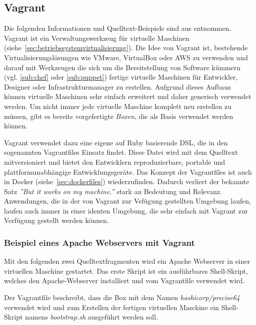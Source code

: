 \subsection{Vagrant}
\label{sub:vagrant}
Die folgenden Informationen und Quelltext-Beispiele sind aus \autocite{Vagrant:online} entnommen.
Vagrant ist ein Verwaltungswerkzeug für virtuelle Maschinen (siehe~\vref{sec:betriebssystemvirtualisierung}).
Die Idee von Vagrant ist, bestehende Virtualisierungslösungen wie VMware, VirtualBox oder AWS zu verwenden und darauf mit Werkzeugen die sich um die Bereitstellung von Software kümmern (vgl. \cref{sub:chef} oder \cref{sub:puppet}) fertige virtuelle Maschinen für Entwickler, Designer oder Infrastrukturmanager zu erstellen.
Aufgrund dieses Aufbaus können virtuelle Maschinen sehr einfach erweitert und daher generisch verwendet werden.
Um nicht immer jede virtuelle Maschine komplett neu erstellen zu müssen, gibt es bereits vorgefertigte \emph{Boxen}, die als Basis verwendet werden können.

Vagrant verwendet dazu eine eigene auf Ruby basierende DSL, die in den sogenannten Vagrantfiles Einsatz findet.
Diese Datei wird mit dem Quelltext mitversioniert und bietet den Entwicklern reproduzierbare, portable und plattformunabhängige Entwicklungsgeräte.
Das Konzept der Vagrantfiles ist auch in Docker (siehe~\vref{sec:dockerfiles}) wiederzufinden.
Dadurch verliert der bekannte Satz \emph{''But it works on my machine.''} stark an Bedeutung und Relevanz.
Anwendungen, die in der von Vagrant zur Vefügung gestellten Umgebung laufen, laufen auch immer in einer identen Umgebung, die sehr einfach mit Vagrant zur Verfügung gestellt werden können.

\subsubsection{Beispiel eines Apache Webservers mit Vagrant}
Mit den folgenden zwei Quelltextfragmenten wird ein Apache Webserver in einer virtuellen Maschine gestartet.
Das erste Skript ist ein ausführbares Shell-Skript, welches den Apache-Webserver installiert und vom Vagrantfile verwendet wird.

\label{lst:vagrant-bootstrap}
Der Vagrantfile beschreibt, dass die Box mit dem Namen \emph{hashicorp/precise64} verwendet wird und zum Erstellen der fertigen virtuellen Maschine ein Shell-Skript namens \emph{bootstrap.sh} ausgeführt werden soll.

\label{lst:vagrantfile}

